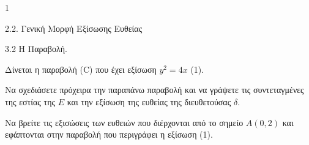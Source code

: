 \begin{ylh}{1}
    \item 2.2. Γενική Μορφή Εξίσωσης Ευθείας
    \item 3.2 Η Παραβολή.
\end{ylh}
Δίνεται η παραβολή (C) που έχει εξίσωση $y^2 = 4x$ (1).
\begin{alist}
\item Να σχεδιάσετε πρόχειρα την παραπάνω παραβολή και να γράψετε τις συντεταγμένες της εστίας της $E$ και την εξίσωση της ευθείας της διευθετούσας $\delta$. 
\item Να βρείτε τις εξισώσεις των ευθειών που διέρχονται από το σημείο $A(0, 2)$ και εφάπτονται στην παραβολή που περιγράφει η εξίσωση (1). 
\end{alist}